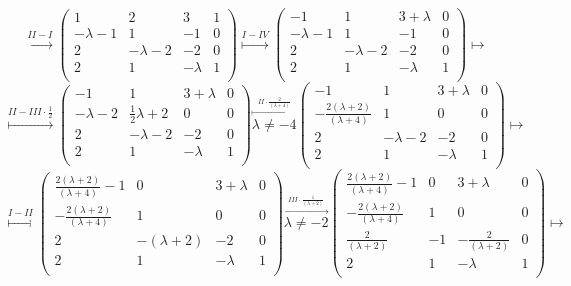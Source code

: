\documentclass[a4paper,12pt]{article}
\begin{document}
$$
\overset{II-I}{\longmapsto}
\begin{pmatrix}
{1}&{2}&{3}&1\\
{-\lambda-1}&{1}&{-1}&0\\
{2}&{-\lambda-2}&{-2}&0\\
{2}&{1}&{-\lambda}&1\\
\end{pmatrix}
\overset{I-IV}{\longmapsto}
\begin{pmatrix}
{-1}&{1}&{3+\lambda}&0\\
{-\lambda-1}&{1}&{-1}&0\\
{2}&{-\lambda-2}&{-2}&0\\
{2}&{1}&{-\lambda}&1\\
\end{pmatrix}
\longmapsto
$$
$$
\overset{II-III \cdot \frac{1}{2}}{\longmapsto}
\begin{pmatrix}
{-1}&{1}&{3+\lambda}&0\\
{-\lambda-2}&{\frac{1}{2}\lambda+2}&{0}&0\\
{2}&{-\lambda-2}&{-2}&0\\
{2}&{1}&{-\lambda}&1\\
\end{pmatrix}
\overset{\overset{II \cdot \frac{2}{(\lambda+4)}}{\longmapsto}}{\lambda \neq -4}
\begin{pmatrix}
{-1}&{1}&{3+\lambda}&0\\
{-\frac{2(\lambda+2)}{(\lambda+4)}}&{1}&{0}&0\\
{2}&{-\lambda-2}&{-2}&0\\
{2}&{1}&{-\lambda}&1\\
\end{pmatrix}
\longmapsto
$$
$$
\overset{I-II}{\longmapsto}
\begin{pmatrix}
{\frac{2(\lambda+2)}{(\lambda+4)}-1}&{0}&{3+\lambda}&0\\
{-\frac{2(\lambda+2)}{(\lambda+4)}}&{1}&{0}&0\\
{2}&{-(\lambda+2)}&{-2}&0\\
{2}&{1}&{-\lambda}&1\\
\end{pmatrix}
\overset{\overset{III \cdot \frac{1}{(\lambda+2)}}{\longmapsto}}{\lambda \neq -2}
\begin{pmatrix}
{\frac{2(\lambda+2)}{(\lambda+4)}-1}&{0}&{3+\lambda}&0\\
{-\frac{2(\lambda+2)}{(\lambda+4)}}&{1}&{0}&0\\
{\frac{2}{(\lambda+2)}}&{-1}&{-\frac{2}{(\lambda+2)}}&0\\
{2}&{1}&{-\lambda}&1\\
\end{pmatrix}
\longmapsto
$$
\end{document}

